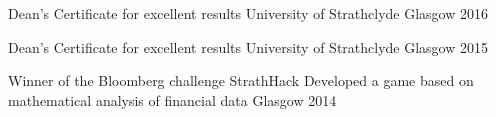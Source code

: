 

\begin{cvhonors}

  \cvhonor
    {Dean's Certificate for excellent results} %
    {University of Strathclyde} %
    {Glasgow} %
    {2016} %

  \cvhonor
    {Dean's Certificate for excellent results} %
    {University of Strathclyde} %
    {Glasgow} %
    {2015} %

  \cvhonor
    {Winner of the Bloomberg challenge} %
    {StrathHack \newline Developed a game based on mathematical analysis of financial data} %
    {Glasgow} %
    {2014} %

\end{cvhonors}
